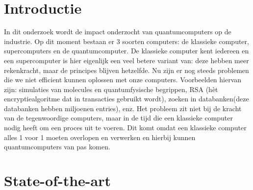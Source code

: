 
\section{Introductie} %
\label{sec:introductie}

In dit onderzoek wordt de impact onderzocht van quantumcomputers op de industrie.
Op dit moment bestaan er 3 soorten computers: de klassieke computer, supercomputers en de quantumcomputer.
De klassieke computer kent iedereen en een supercomputer is hier eigenlijk een veel betere variant van: deze hebben meer rekenkracht, maar de principes blijven hetzelfde.
Nu zijn er nog steeds problemen die we niet efficient kunnen oplossen met onze computers.
Voorbeelden hiervan zijn: simulaties van molecules en quantumfysische begrippen, RSA (hèt encryptiealgoritme dat in transacties gebruikt wordt), zoeken in databanken(deze databanken hebben miljoenen entries), enz.
Het probleem zit niet bij de kracht van de tegenwoordige computers, maar in de tijd die een klassieke computer nodig heeft om een proces uit te voeren.
Dit komt omdat een klassieke computer alles 1 voor 1 moeten overlopen en verwerken en hierbij kunnen quantumcomputers van pas komen.


\section{State-of-the-art}
\label{sec:state-of-the-art}


